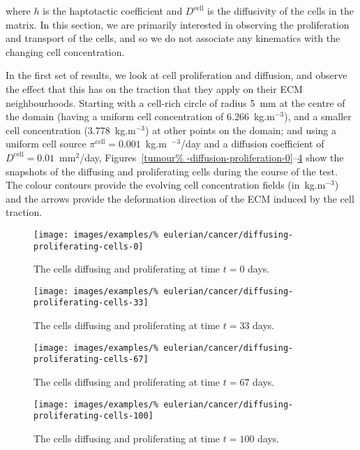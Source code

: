 \noindent where $h$ is the haptotactic coefficient and
$D^{\mathrm{cell}}$ is the diffusivity of the cells in the matrix. In
this section, we are primarily interested in observing the
proliferation and transport of the cells, and so we do not associate
any kinematics with the changing cell concentration.

In the first set of results, we look at cell proliferation and
diffusion, and observe the effect that this has on the traction that
they apply on their ECM neighbourhoods. Starting with a cell-rich
circle of radius 5~mm at the centre of the domain (having a uniform
cell concentration of 6.266~kg.m$^{-3}$), and a smaller cell
concentration (3.778~kg.m$^{-3}$) at other points on the domain; and
using a uniform cell source \mbox{$\pi^{\mathrm{cell}}=0.001$~kg.m%
  $^{-3}$/day} and a diffusion coefficient of \mbox{%
  $D^{\mathrm{cell}}=0.01$~mm$^2$/day,} Figures~\ref{tumour%
  -diffusion-proliferation-0}--\ref{tumour-diffusion-proliferation-100}
show the snapshots of the diffusing and proliferating cells during the
course of the test. The colour contours provide the evolving cell
concentration fields (in~kg.m$^{-3}$) and the arrows provide the
deformation direction of the ECM induced by the cell traction.

\clearpage

\begin{figure}[!hptb]
\centering
\texttt{[image: images/examples/\%
eulerian/cancer/diffusing-proliferating-cells-0]}
\caption{The cells diffusing and proliferating at time $t=0$ days.}
\label{tumour-diffusion-proliferation-0}
\end{figure}

\begin{figure}[!hptb]
\centering
\texttt{[image: images/examples/\%
eulerian/cancer/diffusing-proliferating-cells-33]}
\caption{The cells diffusing and proliferating at time $t=33$ days.}
\label{tumour-diffusion-proliferation-33}
\end{figure}

\begin{figure}[!hptb]
\centering
\texttt{[image: images/examples/\%
eulerian/cancer/diffusing-proliferating-cells-67]}
\caption{The cells diffusing and proliferating at time $t=67$ days.}
\label{tumour-diffusion-proliferation-67}
\end{figure}

\begin{figure}[!hptb]
\centering
\texttt{[image: images/examples/\%
eulerian/cancer/diffusing-proliferating-cells-100]}
\caption{The cells diffusing and proliferating at time $t=100$ days.}
\label{tumour-diffusion-proliferation-100}
\end{figure}

